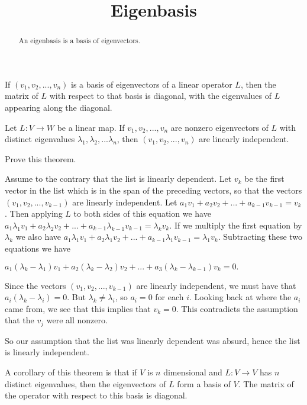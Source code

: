 \documentclass{ximera}
\title{Eigenbasis}
\begin{document}
\begin{abstract}
  An eigenbasis is a basis of eigenvectors.
\end{abstract}

\begin{observation}
  If $(v_1,v_2,...,v_n)$ is a basis of eigenvectors of a linear
  operator $L$, then the matrix of $L$ with respect to that basis is
  diagonal, with the eigenvalues of $L$ appearing along the diagonal.
\end{observation}

\begin{theorem}
  Let $L:V \to W$ be a linear map. If $v_1,v_2,...,v_n$ are nonzero eigenvectors of $L$ with distinct eigenvalues $\lambda_1,\lambda_2,...\lambda_n$, then $(v_1,v_2,...,v_n)$
  are linearly independent.
\end{theorem}

Prove this theorem.

\begin{free-response}
  Assume to the contrary that the list is linearly dependent.  Let $v_k$ be the first vector in the list which is in the span of the preceding vectors, 
  so that the vectors $(v_1,v_2,...,v_{k-1})$  are linearly independent.  
  Let $a_1v_1+a_2v_2+...+a_{k-1}v_{k-1} = v_k$.  Then applying $L$ to both sides of this equation we have
  $a_1\lambda_1 v_1+a_2\lambda_2 v_2+ ...+a_{k-1}\lambda_{k-1} v_{k-1} = \lambda_k v_k$.  If we multiply the first equation by $\lambda_k$ we also have
  $a_1\lambda_1v_1+a_2\lambda_1v_2+...+a_{k-1}\lambda_1v_{k-1} = \lambda_1v_k$.  Subtracting these two equations we have
  
  \(
  a_1(\lambda_k-\lambda_1)v_1+a_2(\lambda_k-\lambda_2)v_2+...+a_3(\lambda_k-\lambda_{k-1})v_k=0.
  \)
  
  Since the vectors   $(v_1,v_2,...,v_{k-1})$  are linearly independent, we must have that $a_i(\lambda_k - \lambda_i) = 0$.  But $\lambda_k \neq \lambda_i$, so 
  $a_i=0$ for each $i$.  Looking back at where the $a_i$ came from, we see that this implies that $v_k=0$.  This contradicts the assumption that the $v_j$ were all nonzero.
  
  So our assumption that the list was linearly dependent was absurd, hence the list is linearly independent.
\end{free-response}

A corollary of this theorem is that if $V$ is $n$ dimensional and $L: V \to V$ has $n$ distinct eigenvalues, then the eigenvectors of $L$ form a basis of $V$.
The matrix of the operator with respect to this basis is diagonal.
	
\end{document}
